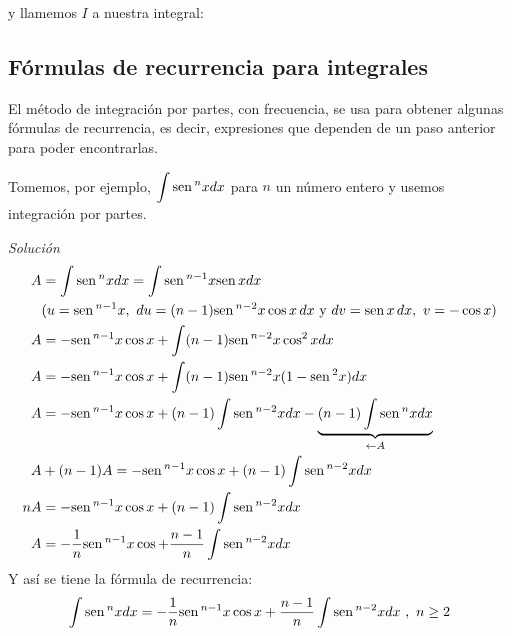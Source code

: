 y llamemos $I$ a nuestra integral:




\subsection*{Fórmulas de recurrencia para integrales}

El método de integración por partes, con frecuencia, se usa para obtener algunas fórmulas de recurrencia, es decir, expresiones que dependen de un paso anterior para poder encontrarlas.
\begin{ejemplo}
\textnormal{Tomemos, por ejemplo, \textit{$\displaystyle{\int \text{\rm sen}\,^{n}xdx}$} para \textit{$n$} un número entero y usemos integración por partes.}
\end{ejemplo}
\textit{Solución}
{\small
\begin{align*}
A&=\int \text{\rm sen}\, ^{n}xdx=\int \text{\rm sen}\, ^{n-1}x\text{\rm sen}\, xdx\\
& (u=\text{\rm sen}\, ^{n-1}x,\ du=(n-1)\text{\rm sen}\,^{n-2}x\cos x\,dx\text{ y } dv=\text{\rm sen}\, x\, dx,\ v=-\cos x)\\
A&=-\text{\rm sen}\, ^{n-1}x\cos x+\int (n-1)\text{\rm sen}\, ^{n-2}x\cos ^{2}xdx\\
A&=-\text{\rm sen}\, ^{n-1}x\cos x+\int (n-1)\text{\rm sen}\, ^{n-2}x(1-\text{\rm sen}\, ^{2}x)dx\\
A&=-\text{\rm sen}\, ^{n-1}x\cos x+(n-1)\int \text{\rm sen}\, ^{n-2}xdx-\underbrace{(n-1)\int \text{\rm sen}\, ^{n}xdx}_{\leftarrow A}\\
A&+(n-1)A=-\text{\rm sen}\, ^{n-1}x\cos x+(n-1)\int \text{\rm sen}\, ^{n-2}xdx\\
nA&=-\text{\rm sen}\, ^{n-1}x\cos x+(n-1)\int \text{\rm sen}\, ^{n-2}xdx\\
A&=-\frac{1}{n}\text{\rm sen}\, ^{n-1}x\cos +\frac{n-1}{n}\int \text{\rm sen}\, ^{n-2}xdx
\end{align*}
}
Y así se tiene la fórmula de recurrencia:
\begin{equation}\label{PotSeno}
\int \text{\rm sen}\, ^{n}xdx=-\frac{1}{n}\text{\rm sen}\, ^{n-1}x\cos x+\frac{n-1}{n}\int
\text{\rm sen}\, ^{n-2}xdx\ ,\ n\geq 2
\end{equation}

